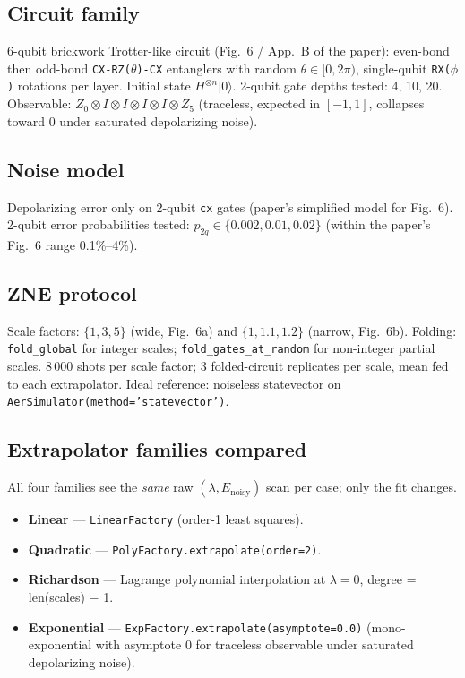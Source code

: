\documentclass[11pt]{article}
\begin{document}
\subsection{Circuit family}
6-qubit brickwork Trotter-like circuit (Fig.~6 / App.~B of the paper): even-bond
then odd-bond \texttt{CX-RZ($\theta$)-CX} entanglers with random
$\theta \in [0, 2\pi)$, single-qubit \texttt{RX($\phi$)} rotations per layer.
Initial state $H^{\otimes n}|0\rangle$. 2-qubit gate depths tested: 4, 10, 20.
Observable: $Z_0 \otimes I \otimes I \otimes I \otimes I \otimes Z_5$ (traceless,
expected in $[-1, 1]$, collapses toward 0 under saturated depolarizing noise).

\subsection{Noise model}
Depolarizing error only on 2-qubit \texttt{cx} gates (paper's simplified model for
Fig.~6). 2-qubit error probabilities tested:
$p_{2q} \in \{0.002, 0.01, 0.02\}$ (within the paper's Fig.~6 range 0.1\%--4\%).

\subsection{ZNE protocol}
Scale factors: $\{1, 3, 5\}$ (wide, Fig.~6a) and $\{1, 1.1, 1.2\}$ (narrow, Fig.~6b).
Folding: \texttt{fold\_global} for integer scales; \texttt{fold\_gates\_at\_random}
for non-integer partial scales. 8\,000 shots per scale factor; 3 folded-circuit
replicates per scale, mean fed to each extrapolator. Ideal reference: noiseless
statevector on \texttt{AerSimulator(method='statevector')}.

\subsection{Extrapolator families compared}
All four families see the \emph{same} raw $(\lambda, E_{\text{noisy}})$ scan per
case; only the fit changes.
\begin{itemize}
  \item \textbf{Linear} --- \texttt{LinearFactory} (order-1 least squares).
  \item \textbf{Quadratic} --- \texttt{PolyFactory.extrapolate(order=2)}.
  \item \textbf{Richardson} --- Lagrange polynomial interpolation at $\lambda = 0$,
        degree = len(scales) $-$ 1.
  \item \textbf{Exponential} --- \texttt{ExpFactory.extrapolate(asymptote=0.0)}
        (mono-exponential with asymptote 0 for traceless observable under
        saturated depolarizing noise).
\end{itemize}
\end{document}
